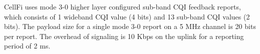 












CellFi uses mode 3-0 higher layer configured sub-band CQI feedback reports, which consists of 1 wideband CQI value (4 bits) and 13 sub-band CQI values (2 bits). 
The payload size for a single mode 3-0 report on a 5 MHz channel is 20 bits per report. 
The overhead of signaling is 10 Kbps on the uplink for a reporting period of 2 ms. 

